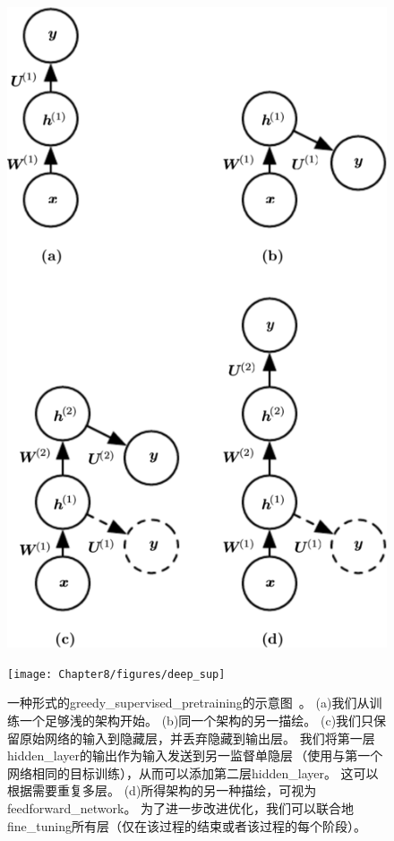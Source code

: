 \begin{figure}[!htb]
\ifOpenSource
\centerline{\includegraphics[scale=0.5]{images/69.png}}
\else
\centerline{\texttt{[image: Chapter8/figures/deep\_sup]}}
\fi
\caption{一种形式的\gls{greedy_supervised_pretraining}的示意图~\citep{Bengio-et-al-2007}。
(a)我们从训练一个足够浅的架构开始。
(b)同一个架构的另一描绘。
(c)我们只保留原始网络的输入到隐藏层，并丢弃隐藏到输出层。 
我们将第一层\gls{hidden_layer}的输出作为输入发送到另一监督单隐层\,（使用与第一个网络相同的目标训练），从而可以添加第二层\gls{hidden_layer}。 
这可以根据需要重复多层。
(d)所得架构的另一种描绘，可视为\gls{feedforward_network}。 
为了进一步改进优化，我们可以联合地\gls{fine_tuning}所有层（仅在该过程的结束或者该过程的每个阶段）。
}
\label{fig:chap8_deep_sup}
\end{figure}


